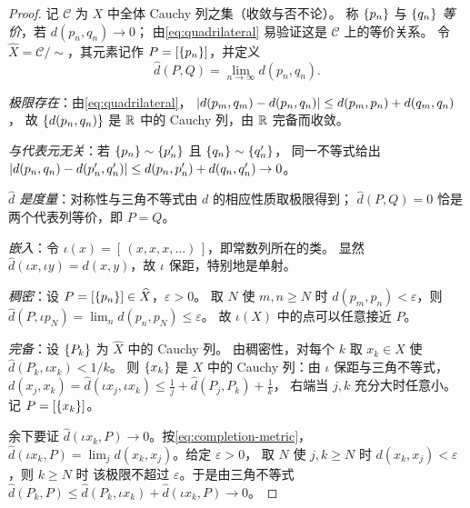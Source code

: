 \begin{proof}
  记 \(\mathcal{C}\) 为 \(X\) 中全体 Cauchy 列之集（收敛与否不论）。
  称 \(\{p_{n}\}\) 与 \(\{q_{n}\}\) \emph{等价}，若 \(d(p_{n},q_{n}) \to 0\)；
  由\cref{eq:quadrilateral} 易验证这是 \(\mathcal{C}\) 上的等价关系。
  令 \(\widehat{X} = \mathcal{C}/\!\sim\)，其元素记作 \(P = [\{p_{n}\}]\)，并定义
  \begin{equation}
    \label{eq:completion-metric}
    \widehat{d}(P,Q) = \lim_{n \to \infty} d(p_{n},q_{n}).
  \end{equation}

  \emph{极限存在}：由\cref{eq:quadrilateral}，
  \(\lvert d(p_{m},q_{m}) - d(p_{n},q_{n})\rvert \le d(p_{m},p_{n}) + d(q_{m},q_{n})\)，
  故 \(\{d(p_{n},q_{n})\}\) 是 \(\mathbb{R}\) 中的 Cauchy 列，由 \(\mathbb{R}\) 完备而收敛。

  \emph{与代表元无关}：若 \(\{p_{n}\} \sim \{p'_{n}\}\) 且 \(\{q_{n}\} \sim \{q'_{n}\}\)，
  同一不等式给出 \(\lvert d(p_{n},q_{n})-d(p'_{n},q'_{n})\rvert \le d(p_{n},p'_{n})+d(q_{n},q'_{n}) \to 0\)。

  \emph{\(\widehat{d}\) 是度量}：对称性与三角不等式由 \(d\) 的相应性质取极限得到；
  \(\widehat{d}(P,Q)=0\) 恰是两个代表列等价，即 \(P=Q\)。

  \emph{嵌入}：令 \(\iota(x) = [\,(x,x,x,\dots)\,]\)，即常数列所在的类。
  显然 \(\widehat{d}(\iota x, \iota y) = d(x,y)\)，故 \(\iota\) 保距，特别地是单射。

  \emph{稠密}：设 \(P = [\{p_{n}\}] \in \widehat{X}\)，\(\varepsilon>0\)。
  取 \(N\) 使 \(m,n \ge N\) 时 \(d(p_{m},p_{n})<\varepsilon\)，则
  \(\widehat{d}(P, \iota p_{N}) = \lim_{n} d(p_{n},p_{N}) \le \varepsilon\)。
  故 \(\iota(X)\) 中的点可以任意接近 \(P\)。

  \emph{完备}：设 \(\{P_{k}\}\) 为 \(\widehat{X}\) 中的 Cauchy 列。
  由稠密性，对每个 \(k\) 取 \(x_{k} \in X\) 使 \(\widehat{d}(P_{k}, \iota x_{k}) < 1/k\)。
  则 \(\{x_{k}\}\) 是 \(X\) 中的 Cauchy 列：由 \(\iota\) 保距与三角不等式，
  \(d(x_{j},x_{k}) = \widehat{d}(\iota x_{j},\iota x_{k})
    \le \tfrac{1}{j} + \widehat{d}(P_{j},P_{k}) + \tfrac{1}{k}\)，
  右端当 \(j,k\) 充分大时任意小。记 \(P = [\{x_{k}\}]\)。

  余下要证 \(\widehat{d}(\iota x_{k},P) \to 0\)。按\cref{eq:completion-metric}，
  \(\widehat{d}(\iota x_{k},P) = \lim_{j} d(x_{k},x_{j})\)。给定 \(\varepsilon>0\)，
  取 \(N\) 使 \(j,k \ge N\) 时 \(d(x_{k},x_{j})<\varepsilon\)，则 \(k \ge N\) 时
  该极限不超过 \(\varepsilon\)。于是由三角不等式
  \(\widehat{d}(P_{k},P) \le \widehat{d}(P_{k},\iota x_{k}) + \widehat{d}(\iota x_{k},P) \to 0\)。
\end{proof}


